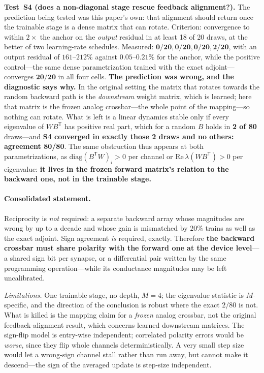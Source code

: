 \documentclass[11pt]{article}
\begin{document}
\textbf{Test~S4 (does a non-diagonal stage rescue feedback alignment?).} The prediction being tested was this paper's own: that alignment should return once the trainable stage is a dense matrix that can rotate. Criterion: convergence to within $2\times$ the anchor on the \textit{output} residual in at least 18 of 20 draws, at the better of two learning-rate schedules. Measured: $\mathbf{0/20, 0/20, 0/20, 2/20}$, with an output residual of $161$--$212\%$ against $0.05$--$0.21\%$ for the anchor, while the positive control---the same dense parametrization trained with the exact adjoint---converges $\mathbf{20/20}$ in all four cells. \textbf{The prediction was wrong, and the diagnostic says why.} In the original setting the matrix that rotates towards the random backward path is the \textit{downstream} weight matrix, which is learned; here that matrix is the frozen analog crossbar---the whole point of the mapping---so nothing can rotate. What is left is a linear dynamics stable only if every eigenvalue of $WB^{\mathsf T}$ has positive real part, which for a random $B$ holds in \textbf{2 of 80} draws---and \textbf{S4 converged in exactly those 2 draws and no others: agreement 80/80}. The same obstruction thus appears at both parametrizations, as $\mathrm{diag}(B^{\mathsf T}W)_i > 0$ per channel or $\mathrm{Re}\,\lambda(WB^{\mathsf T}) > 0$ per eigenvalue: \textbf{it lives in the frozen forward matrix's relation to the backward one, not in the trainable stage.}

\paragraph{Consolidated statement.} Reciprocity is \textit{not} required: a separate backward array whose magnitudes are wrong by up to a decade and whose gain is mismatched by $20\%$ trains as well as the exact adjoint. Sign agreement \textit{is} required, exactly. Therefore \textbf{the backward crossbar must share polarity with the forward one at the device level}---a shared sign bit per synapse, or a differential pair written by the same programming operation---while its conductance magnitudes may be left uncalibrated.

\textit{Limitations.} One trainable stage, no depth, $M = 4$; the eigenvalue statistic is $M$-specific, and the direction of the conclusion is robust where the exact $2/80$ is not. What is killed is the mapping claim for a \textit{frozen} analog crossbar, not the original feedback-alignment result, which concerns learned downstream matrices. The sign-flip model is entry-wise independent; correlated polarity errors would be \textit{worse}, since they flip whole channels deterministically. A very small step size would let a wrong-sign channel stall rather than run away, but cannot make it descend---the sign of the averaged update is step-size independent.
\end{document}
